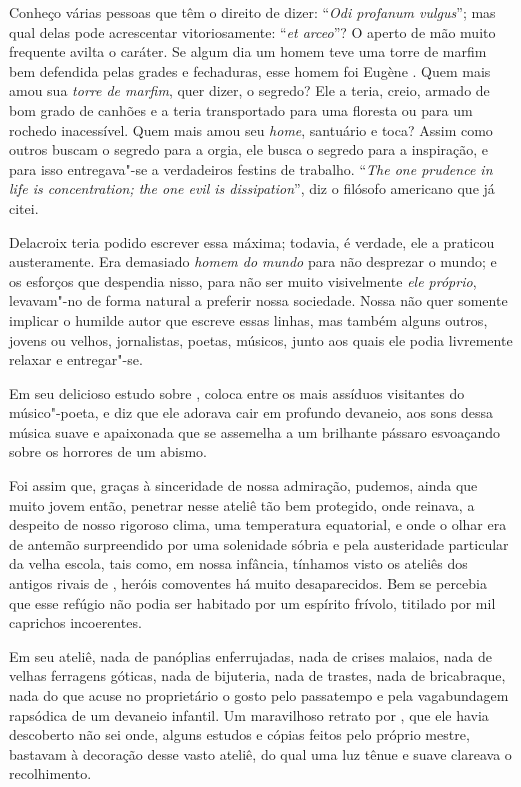 \sectionitem

Conheço várias pessoas que têm o direito de dizer: “\textit{Odi profanum
vulgus}”; mas qual delas pode acrescentar vitoriosamente: “\textit{et
arceo}”? O aperto de mão muito frequente avilta o caráter. Se algum dia
um homem teve uma torre de marfim bem defendida pelas grades e
fechaduras, esse homem foi Eugène . Quem mais amou sua
\textit{torre de marfim}, quer dizer, o segredo? Ele a teria, creio,
armado de bom grado de canhões e a teria transportado para uma floresta
ou para um rochedo inacessível. Quem mais amou seu \textit{home},
santuário e toca? Assim como outros buscam o segredo para a orgia, ele
busca o segredo para a inspiração, e para isso entregava"-se a
verdadeiros festins de trabalho. “\textit{The one prudence in life is
concentration; the one evil is dissipation}”, diz o filósofo americano
que já citei.

Delacroix teria podido escrever essa máxima; todavia, é verdade, ele a
praticou austeramente. Era demasiado \textit{homem do mundo} para não
desprezar o mundo; e os esforços que despendia nisso, para não ser
muito visivelmente \textit{ele próprio}, levavam"-no de forma natural a
preferir nossa sociedade. Nossa não quer somente implicar o humilde
autor que escreve essas linhas, mas também alguns outros, jovens ou
velhos, jornalistas, poetas, músicos, junto aos quais ele podia
livremente relaxar e entregar"-se.

Em seu delicioso estudo sobre ,  coloca  entre os
mais assíduos visitantes do músico"-poeta, e diz que ele adorava cair em
profundo devaneio, aos sons dessa música suave e apaixonada que se
assemelha a um brilhante pássaro esvoaçando sobre os horrores de um
abismo.

Foi assim que, graças à sinceridade de nossa admiração, pudemos, ainda
que muito jovem então, penetrar nesse ateliê tão bem protegido, onde
reinava, a despeito de nosso rigoroso clima, uma temperatura
equatorial, e onde o olhar era de antemão surpreendido por uma solenidade sóbria e pela
austeridade particular da velha escola, tais como, em nossa infância,
tínhamos visto os ateliês dos antigos rivais de , heróis
comoventes há muito desaparecidos. Bem se percebia que esse refúgio não
podia ser habitado por um espírito frívolo, titilado por mil caprichos
incoerentes.

Em seu ateliê, nada de panóplias enferrujadas, nada de crises malaios,
nada de velhas ferragens góticas, nada de bijuteria, nada de trastes,
nada de bricabraque, nada do que acuse no proprietário o gosto pelo
passatempo e pela vagabundagem rapsódica de um devaneio infantil. Um
maravilhoso retrato por , que ele havia descoberto não sei
onde, alguns estudos e cópias feitos pelo próprio mestre, bastavam à
decoração desse vasto ateliê, do qual uma luz tênue e suave clareava o
recolhimento.

